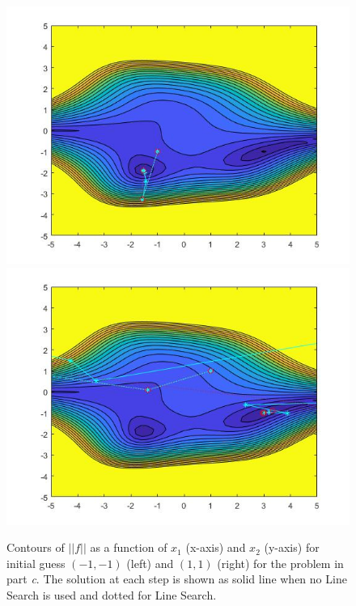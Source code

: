 \begin{figure}[H]
 \centering  
   {\includegraphics[width=0.49\linewidth]{code/fun3_a1.jpg}}   
   {\includegraphics[width=0.49\linewidth]{code/fun3_a2.jpg}}
  \caption{Contours of $||f||$ as a function of $x_{1}$ (x-axis) and $x_{2}$ (y-axis) for initial guess $(-1,-1)$ (left) and $(1,1)$ (right) for the problem in part \emph{c}. The solution at each step is shown as solid line when no Line Search is used and dotted for Line Search.}
   \label{fig:fig_c}
\end{figure} 